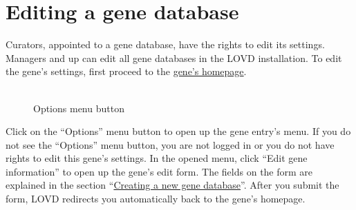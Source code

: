\documentclass[a4paper,oneside,openany,12pt]{memoir}
\renewenvironment{leftbar}[1][\hsize]
{%
    \def\FrameCommand
    {%
        {\color{LOVDdark}\vrule width 3pt \hspace{5pt}}%
        \colorbox{LOVDlight}%
    }%
    \MakeFramed{\hsize#1\advance\hsize-\width\FrameRestore}%
}
{\endMakeFramed}
\begin{document}
%
%





\section{Editing a gene database}
Curators, appointed to a gene database, have the rights to edit its settings.
Managers and up can edit all gene databases in the LOVD installation.
To edit the gene's settings, first proceed to the \hyperlink{sec:gene_homepage}{gene's homepage}.

\begin{figure} %
  \vspace{-25pt}
  \begin{framed}
    \\Options menu button
  \end{framed}
\end{figure}
Click on the ``Options'' menu button to open up the gene entry's menu.
If you do not see the ``Options'' menu button, you are not logged in or you do not have rights to edit this gene's settings.
In the opened menu, click ``Edit gene information'' to open up the gene's edit form.
The fields on the form are explained in the section ``\hyperlink{sec:gene_create}{Creating a new gene database}''.
After you submit the form, LOVD redirects you automatically back to the gene's homepage.
\end{document}
